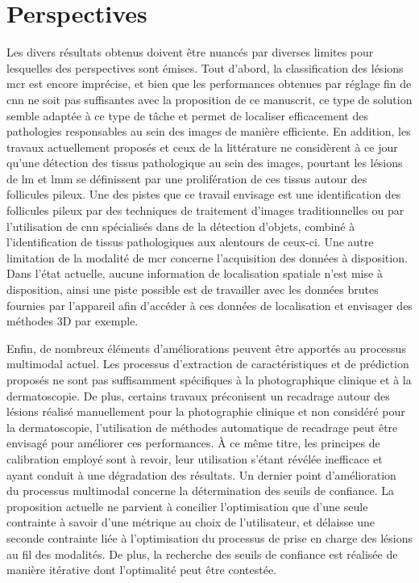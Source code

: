 \section*{Perspectives}
Les divers résultats obtenus doivent être nuancés par diverses limites pour lesquelles des perspectives sont émises. Tout d'abord, la classification des lésions \gls{mcr} est encore imprécise, et bien que les performances obtenues par réglage fin de \gls{cnn} ne soit pas suffisantes avec la proposition de ce manuscrit, ce type de solution semble adaptée à ce type de tâche et permet de localiser efficacement des pathologies responsables au sein des images de manière efficiente. En addition, les travaux actuellement proposés et ceux de la littérature ne considèrent à ce jour qu'une détection des tissus pathologique au sein des images, pourtant les lésions de \gls{lm} et \gls{lmm} se définissent par une prolifération de ces tissus autour des follicules pileux. Une des pistes que ce travail envisage est une identification des follicules pileux par des techniques de traitement d'images traditionnelles ou par l'utilisation de \gls{cnn} spécialisés dans de la détection d'objets, combiné à l'identification de tissus pathologiques aux alentours de ceux-ci. Une autre limitation de la modalité de \gls{mcr} concerne l'acquisition des données à disposition. Dans l'état actuelle, aucune information de localisation spatiale n'est mise à disposition, ainsi une piste possible est de travailler avec les données brutes fournies par l'appareil afin d'accéder à ces données de localisation et envisager des méthodes 3D par exemple.\par

Enfin, de nombreux éléments d'améliorations peuvent être apportés au processus multimodal actuel. Les processus d'extraction de caractéristiques et de prédiction proposés ne sont pas suffisamment spécifiques à la photographique clinique et à la dermatoscopie. De plus, certains travaux préconisent un recadrage autour des lésions réalisé manuellement pour la photographie clinique et non considéré pour la dermatoscopie, l'utilisation de méthodes automatique de recadrage peut être envisagé pour améliorer ces performances. À ce même titre, les principes de calibration employé sont à revoir, leur utilisation s'étant révélée inefficace et ayant conduit à une dégradation des résultats. Un dernier point d'amélioration du processus multimodal concerne la détermination des seuils de confiance. La proposition actuelle ne parvient à concilier l'optimisation que d'une seule contrainte à savoir d'une métrique au choix de l'utilisateur, et délaisse une seconde contrainte liée à l'optimisation du processus de prise en charge des lésions au fil des modalités. De plus, la recherche des seuils de confiance est réalisée de manière itérative dont l'optimalité peut être contestée.\par
\clearpage

